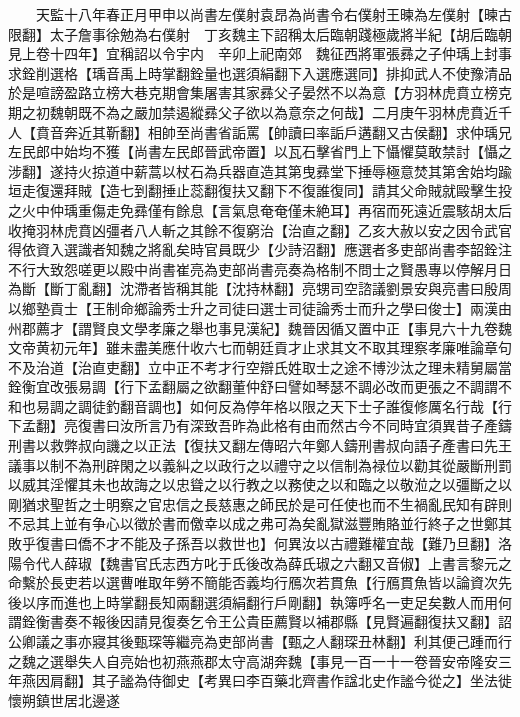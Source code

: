 　　天監十八年春正月甲申以尚書左僕射袁昂為尚書令右僕射王暕為左僕射【暕古限翻】太子詹事徐勉為右僕射　丁亥魏主下詔稱太后臨朝踐極歲將半紀【胡后臨朝見上卷十四年】宜稱詔以令宇内　辛卯上祀南郊　魏征西將軍張彞之子仲瑀上封事求銓削選格【瑀音禹上時掌翻銓量也選須絹翻下入選應選同】排抑武人不使豫清品於是喧謗盈路立榜大巷克期會集屠害其家彞父子晏然不以為意【方羽林虎賁立榜克期之初魏朝既不為之嚴加禁遏縱彞父子欲以為意奈之何哉】二月庚午羽林虎賁近千人【賁音奔近其靳翻】相帥至尚書省詬罵【帥讀曰率詬戶遘翻又古侯翻】求仲瑀兄左民郎中始均不獲【尚書左民郎晉武帝置】以瓦石擊省門上下懾懼莫敢禁討【懾之涉翻】遂持火掠道中薪蒿以杖石為兵器直造其第曳彞堂下捶辱極意焚其第舍始均踰垣走復還拜賊【造七到翻捶止蕊翻復扶又翻下不復誰復同】請其父命賊就毆擊生投之火中仲瑀重傷走免彞僅有餘息【言氣息奄奄僅未絶耳】再宿而死遠近震駭胡太后收掩羽林虎賁凶彊者八人斬之其餘不復窮治【治直之翻】乙亥大赦以安之因令武官得依資入選識者知魏之將亂矣時官員既少【少詩沼翻】應選者多吏部尚書李韶銓注不行大致怨嗟更以殿中尚書崔亮為吏部尚書亮奏為格制不問士之賢愚專以停解月日為斷【斷丁亂翻】沈滯者皆稱其能【沈持林翻】亮甥司空諮議劉景安與亮書曰殷周以鄉塾貢士【王制命鄉論秀士升之司徒曰選士司徒論秀士而升之學曰俊士】兩漢由州郡薦才【謂賢良文學孝廉之舉也事見漢紀】魏晉因循又置中正【事見六十九卷魏文帝黄初元年】雖未盡美應什收六七而朝廷貢才止求其文不取其理察孝廉唯論章句不及治道【治直吏翻】立中正不考才行空辯氏姓取士之途不博沙汰之理未精舅屬當銓衡宜改張易調【行下孟翻屬之欲翻董仲舒曰譬如琴瑟不調必改而更張之不調謂不和也易調之調徒釣翻音調也】如何反為停年格以限之天下士子誰復修厲名行哉【行下孟翻】亮復書曰汝所言乃有深致吾昨為此格有由而然古今不同時宜須異昔子產鑄刑書以救弊叔向譏之以正法【復扶又翻左傳昭六年鄭人鑄刑書叔向語子產書曰先王議事以制不為刑辟閑之以義糾之以政行之以禮守之以信制為禄位以勸其從嚴斷刑罰以威其淫懼其未也故誨之以忠聳之以行教之以務使之以和臨之以敬涖之以彊斷之以剛猶求聖哲之士明察之官忠信之長慈惠之師民於是可任使也而不生禍亂民知有辟則不忌其上並有争心以徵於書而儌幸以成之弗可為矣亂獄滋豐賄賂並行終子之世鄭其敗乎復書曰僑不才不能及子孫吾以救世也】何異汝以古禮難權宜哉【難乃旦翻】洛陽令代人薛琡【魏書官氏志西方叱于氏後改為薛氏琡之六翻又音俶】上書言黎元之命繫於長吏若以選曹唯取年勞不簡能否義均行鴈次若貫魚【行鴈貫魚皆以論資次先後以序而進也上時掌翻長知兩翻選須絹翻行戶剛翻】執簿呼名一吏足矣數人而用何謂銓衡書奏不報後因請見復奏乞令王公貴臣薦賢以補郡縣【見賢遍翻復扶又翻】詔公卿議之事亦寢其後甄琛等繼亮為吏部尚書【甄之人翻琛丑林翻】利其便己踵而行之魏之選舉失人自亮始也初燕燕郡太守高湖奔魏【事見一百一十一卷晉安帝隆安三年燕因肩翻】其子謐為侍御史【考異曰李百藥北齊書作諡北史作謐今從之】坐法徙懷朔鎮世居北邊遂

